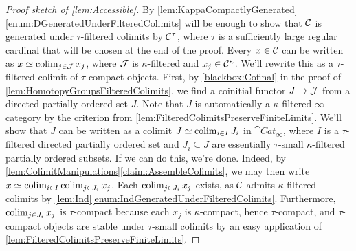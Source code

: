 \begin{proof}[Proof sketch of \cref{lem:Accessible}]
	By \cref{lem:KappaCompactlyGenerated}\cref{enum:DGeneratedUnderFilteredColimits} will be enough to show that $\mathcal{C}$ is generated under $\tau$-filtered colimits by $\mathcal{C}^\tau$, where $\tau$ is a sufficiently large regular cardinal that will be chosen at the end of the proof. Every $x\in\mathcal{C}$ can be written as $x\simeq \operatorname*{colim}_{j\in\mathcal{J}}x_j$, where $\mathcal{J}$ is $\kappa$-filtered and $x_j\in\mathcal{C}^\kappa$. We'll rewrite this as a $\tau$-filtered colimit of $\tau$-compact objects. First, by \cref{blackbox:Cofinal} in the proof of \cref{lem:HomotopyGroupsFilteredColimits}, we find a coinitial functor $J\rightarrow\mathcal{J}$ from a directed partially ordered set $J$. Note that $J$ is automatically a $\kappa$-filtered $\infty$-category by the criterion from \cref{lem:FilteredColimitsPreserveFiniteLimits}. We'll show that $J$ can be written as a colimit $J\simeq \operatorname*{colim}_{i\in I}J_i$ in $\cat{Cat}_\infty$, where $I$ is a $\tau$-filtered directed partially ordered set and $J_i\subseteq J$ are essentially $\tau$-small $\kappa$-filtered partially ordered subsets. If we can do this, we're done. Indeed, by \cref{lem:ColimitManipulations}\cref{claim:AssembleColimits}, we may then write $x\simeq \operatorname*{colim}_{i\in I}\operatorname*{colim}_{j\in J_i}x_j$. Each $\operatorname*{colim}_{j\in J_i}x_j$ exists, as $\mathcal{C}$ admits $\kappa$-filtered colimits by \cref{lem:Ind}\cref{enum:IndGeneratedUnderFilteredColimits}. Furthermore, $\operatorname*{colim}_{j\in J_i}x_j$ is $\tau$-compact because each $x_j$ is $\kappa$-compact, hence $\tau$-compact, and $\tau$-compact objects are stable under $\tau$-small colimits by an easy application of \cref{lem:FilteredColimitsPreserveFiniteLimits}.
	

\end{proof}
